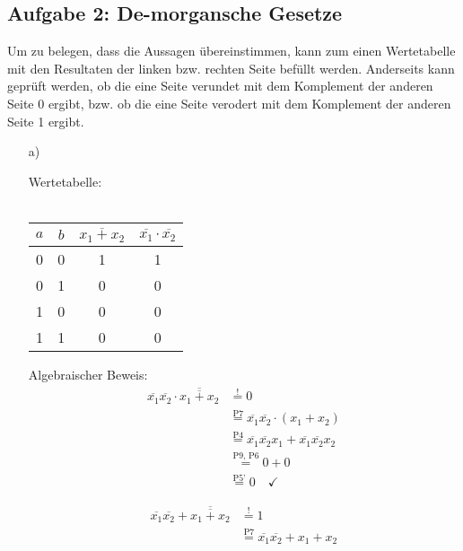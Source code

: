 \documentclass{article}
\newcommand{\nyet}{\overline}
\begin{document}
	\subsection*{Aufgabe 2: De-morgansche Gesetze}
	Um zu belegen, dass die Aussagen übereinstimmen, kann zum einen Wertetabelle mit den Resultaten der linken bzw. rechten Seite befüllt werden. Anderseits kann geprüft werden, ob die eine Seite verundet mit dem Komplement der anderen Seite 0 ergibt, bzw. ob die eine Seite verodert mit dem Komplement der anderen Seite 1 ergibt. 
	\begin{enumerate}
		\item[a)]
		\begin{minipage}[t]{0.27\textwidth}
			Wertetabelle:\\\\
			\begin{tabular}[t]{cc|cc}
				$a$ & $b$ & $\nyet{x_1 + x_2}$ & $ \nyet{x_1} \cdot \nyet{x_2}$ \\ \hline
				0 & 0 & 1 & 1 \\
				0 & 1 & 0 & 0 \\
				1 & 0 & 0 & 0 \\
				1 & 1 & 0 & 0
			\end{tabular}
		\end{minipage}
		\begin{minipage}[t]{0.35\textwidth}
			Algebraischer Beweis: 
			\begin{align*}
				\nyet{x_1} \nyet{x_2} \cdot \nyet{\nyet{x_1 + x_2}} &\stackrel{!}{=} 0 \\
				&\stackrel{\text{P7}}{=} \nyet{x_1} \nyet{x_2} \cdot (x_1 + x_2) \\
				&\stackrel{\text{P4}}{=} \nyet{x_1} \nyet{x_2} x_1 + \nyet{x_1} \nyet{x_2} x_2 \\
				&\stackrel{\text{P9, P6}}{=} 0 + 0 \\
				&\stackrel{\text{P5'}}{=} 0 \quad \checkmark
			\end{align*}
		\end{minipage}
		\begin{minipage}[t]{0.3\textwidth}
			\vspace{0.3em}
			\begin{align*}
				\nyet{x_1} \nyet{x_2} + \nyet{\nyet{x_1 + x_2}} &\stackrel{!}{=} 1 \\
				&\stackrel{\text{P7}}{=} \nyet{x_1} \nyet{x_2} + x_1 + x_2 
			\end{align*}
		\end{minipage}\\\\

\end{enumerate}
\end{document}
